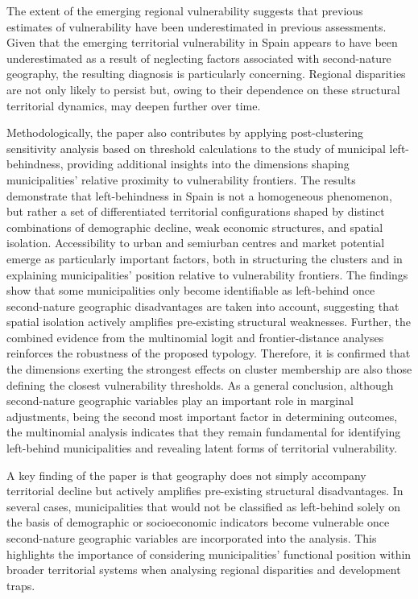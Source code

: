 \documentclass[a4paper,11pt,oneside]{article}
\begin{document}
The extent of the emerging regional vulnerability suggests that previous estimates of vulnerability have been underestimated in previous assessments. Given that the emerging territorial vulnerability in Spain appears to have been underestimated as a result of neglecting factors associated with second-nature geography, the resulting diagnosis is particularly concerning. Regional disparities are not only likely to persist but, owing to their dependence on these structural territorial dynamics, may deepen further over time.

Methodologically, the paper also contributes by applying post-clustering sensitivity analysis based on threshold calculations to the study of municipal left-behindness, providing additional insights into the dimensions shaping municipalities’ relative proximity to vulnerability frontiers.
The results demonstrate that left-behindness in Spain is not a homogeneous phenomenon, but rather a set of differentiated territorial configurations shaped by distinct combinations of demographic decline, weak economic structures, and spatial isolation. Accessibility to urban and semiurban centres and market potential emerge as particularly important factors, both in structuring the clusters and in explaining municipalities’ position relative to vulnerability frontiers. The findings show that some municipalities only become identifiable as left-behind once second-nature geographic disadvantages are taken into account, suggesting that spatial isolation actively amplifies pre-existing structural weaknesses. Further, the combined evidence from the multinomial logit and frontier-distance analyses reinforces the robustness of the proposed typology. Therefore, it is confirmed that the dimensions exerting the strongest effects on cluster membership are also those defining the closest vulnerability thresholds. As a general conclusion, although second-nature geographic variables play an important role in marginal adjustments, being the second most important factor in determining outcomes, the multinomial analysis indicates that they remain fundamental for identifying left-behind municipalities and revealing latent forms of territorial vulnerability.

A key finding of the paper is that geography does not simply accompany territorial decline but actively amplifies pre-existing structural disadvantages. In several cases, municipalities that would not be classified as left-behind solely on the basis of demographic or socioeconomic indicators become vulnerable once second-nature geographic variables are incorporated into the analysis. This highlights the importance of considering municipalities’ functional position within broader territorial systems when analysing regional disparities and development traps.
\end{document}
